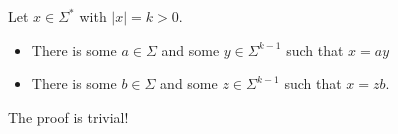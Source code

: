 \newpage
\newcommand\tokthe{\token{the}}
\newcommand\tokboy{\token{boy}}
\newcommand\tokgirl{\token{girl}}
\newcommand\tokkicks{\token{kicks}}
\newcommand\tokball{\token{ball}}
\newcommand\tokcat{\token{cat}}
\newcommand\tokand{\token{and}}


\newpage
\begin{prop}
 Let $x \in \Sigma^*$ with $|x| = k > 0$.
 \begin{itemize}
  \item There is some $a\in\Sigma$ and some
  $y \in \Sigma^{k-1}$ such that $x=ay$
  \item There is some $b \in \Sigma$ and some $z \in
  \Sigma^{k-1}$ such that $x = zb$.
 \end{itemize}
 The proof is trivial!
\end{prop}
